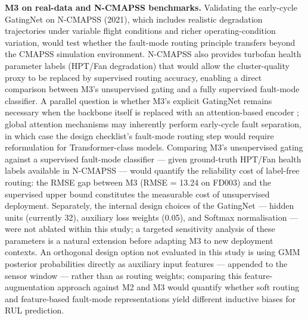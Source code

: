 \documentclass[preprint,10pt]{elsarticle}
\begin{document}
\textbf{M3 on real-data and N-CMAPSS benchmarks.} Validating the early-cycle GatingNet on N-CMAPSS (2021), which includes realistic degradation trajectories under variable flight conditions and richer operating-condition variation, would test whether the fault-mode routing principle transfers beyond the CMAPSS simulation environment. N-CMAPSS also provides turbofan health parameter labels (HPT/Fan degradation) that would allow the cluster-quality proxy to be replaced by supervised routing accuracy, enabling a direct comparison between M3's unsupervised gating and a fully supervised fault-mode classifier. A parallel question is whether M3's explicit GatingNet remains necessary when the backbone itself is replaced with an attention-based encoder \cite{ref08,ref11,ref13,ref14}; global attention mechanisms may inherently perform early-cycle fault separation, in which case the design checklist's fault-mode routing step would require reformulation for Transformer-class models. Comparing M3's unsupervised gating against a supervised fault-mode classifier --- given ground-truth HPT/Fan health labels available in N-CMAPSS --- would quantify the reliability cost of label-free routing: the RMSE gap between M3 (RMSE = 13.24 on FD003) and the supervised upper bound constitutes the measurable cost of unsupervised deployment. Separately, the internal design choices of the GatingNet --- hidden units (currently 32), auxiliary loss weights (0.05), and Softmax normalisation --- were not ablated within this study; a targeted sensitivity analysis of these parameters is a natural extension before adapting M3 to new deployment contexts. An orthogonal design option not evaluated in this study is using GMM posterior probabilities directly as auxiliary input features --- appended to the sensor window --- rather than as routing weights; comparing this feature-augmentation approach against M2 and M3 would quantify whether soft routing and feature-based fault-mode representations yield different inductive biases for RUL prediction.
\end{document}
